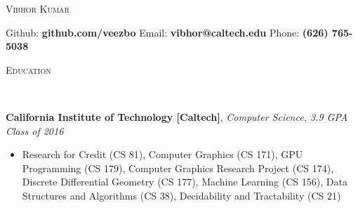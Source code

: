 \documentclass[9pt]{article}
\newenvironment{changemargin}[2]{%
  \begin{list}{}{%
    \setlength{\topsep}{0pt}%
    \setlength{\leftmargin}{#1}%
    \setlength{\rightmargin}{#2}%
    \setlength{\listparindent}{\parindent}%
    \setlength{\itemindent}{\parindent}%
    \setlength{\parsep}{\parskip}%
  }%
  \item[]}{\end{list}
}
\newcommand{\lineover}{
	\begin{changemargin}{-0.05in}{-0.05in}
		\vspace*{-8pt}
		\hrulefill \\
		\vspace*{-2pt}
	\end{changemargin}
}
\newcommand{\header}[1]{
	\begin{changemargin}{-0.5in}{-0.5in}
		\scshape{#1}\\
  	\lineover
	\end{changemargin}
}
\newenvironment{body} {
	\vspace*{-16pt}
	\begin{changemargin}{-0.25in}{-0.5in}
  }	
	{\end{changemargin}
}
\begin{document}
\begin{center} 
	{\Large \scshape Vibhor Kumar} 
\end{center}
Github: \textbf{github.com/veezbo} \hspace{5mm} Email: \textbf{vibhor@caltech.edu} \hfill Phone: \textbf{(626) 765-5038}\\
\vspace{3pt}
\smallskip
\header{Education}
\smallskip
\begin{body}
	\vspace{14pt}
	\textbf{California Institute of Technology [Caltech]}{}, \emph{Computer Science, 3.9 GPA} \hfill \emph{Class of 2016}{} \\
	\begin{itemize} \itemsep -0pt
	\item Research for Credit (CS 81), Computer Graphics (CS 171), GPU Programming (CS 179),  Computer Graphics Research Project (CS 174), Discrete Differential Geometry (CS 177), Machine Learning (CS 156), Data Structures and Algorithms (CS 38), Decidability and Tractability (CS 21)
	\end{itemize}
\end{body}

\smallskip
\end{document}
